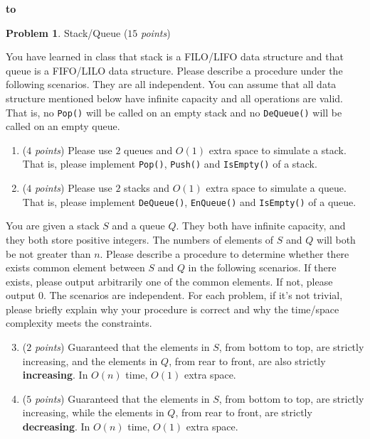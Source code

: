 \documentclass[12pt,a4paper]{report}
\newcommand{\points}[1]{ ($#1$ \textit{points}) }
\theoremstyle{definition}
\newtheorem{problem}{\textbf{Problem}}
\theoremstyle{definition}
\def\headline#1{\hbox to \hsize{\hrulefill\quad\lower.3em\hbox{#1}\quad\hrulefill}}
\def\headline#1{\hbox to \hsize{\hrulefill\quad\lower.3em\hbox{#1}\quad\hrulefill}}
\begin{document}
\vspace{5pt}

\begin{center}
\textbf{\headline{\large Non-Programming Part}}
\end{center}
\vspace{10pt}

\begin{problem} Stack/Queue \points{15}

    You have learned in class that stack is a FILO/LIFO data structure and that queue is a FIFO/LILO data structure.
    Please describe a procedure under the following scenarios. They are all independent.
    You can assume that all data structure mentioned below have infinite capacity and all operations are valid.
    That is, no \texttt{Pop()} will be called on an empty stack and no \texttt{DeQueue()} will be called on an empty queue.
\begin{enumerate}[label=\alph*.]
    \item \points{4}Please use $2$ queues and $O(1)$ extra space to simulate a stack. That is, please implement \texttt{Pop()}, \texttt{Push()} and \texttt{IsEmpty()} of a stack.
    \item \points{4}Please use $2$ stacks and $O(1)$ extra space to simulate a queue. That is, please implement \texttt{DeQueue()}, \texttt{EnQueue()} and \texttt{IsEmpty()} of a queue.
\end{enumerate}
    You are given a stack $S$ and a queue $Q$. They both have infinite capacity, and they both store positive integers. The numbers of elements of $S$ and $Q$ will both be not greater than $n$. Please describe a procedure to determine whether there exists common element between $S$ and $Q$ in the following scenarios. If there exists, please output arbitrarily one of the common elements. If not, please output $0$.  The scenarios are independent.
    For each problem, if it's not trivial, please briefly explain why your procedure is correct and why the time/space complexity meets the constraints.
\begin{enumerate}[label=\alph*.]
    \setcounter{enumi}{2}
\item \points{2}Guaranteed that the elements in $S$, from bottom to top, are strictly increasing, and the elements in $Q$, from rear to front, are also strictly \textbf{increasing}. In $O(n)$ time, $O(1)$ extra space.
\item \points{5}Guaranteed that the elements in $S$, from bottom to top, are strictly increasing, while the elements in $Q$, from rear to front, are strictly \textbf{decreasing}. In $O(n)$ time, $O(1)$ extra space.
\end{enumerate}
\end{problem}
\newpage
\end{document}
